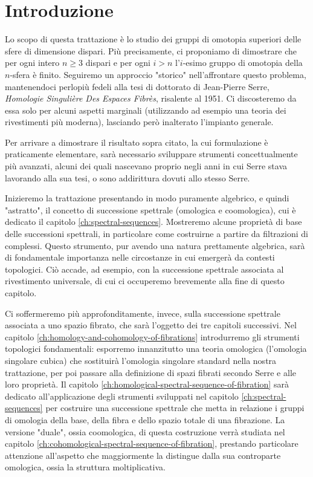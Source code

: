 \chapter*{Introduzione}
Lo scopo di questa trattazione è lo studio dei gruppi di omotopia superiori delle sfere di dimensione dispari. Più precisamente, ci proponiamo di dimostrare che per ogni intero $n\ge 3$ dispari e per ogni $i>n$ l'$i$-esimo gruppo di omotopia della $n$-sfera è finito. Seguiremo un approccio "storico" nell'affrontare questo problema, mantenendoci perlopiù fedeli alla tesi di dottorato di Jean-Pierre Serre, \emph{Homologie Singulière Des Espaces Fibrès}, risalente al 1951. Ci discosteremo da essa solo per alcuni aspetti marginali (utilizzando ad esempio una teoria dei rivestimenti più moderna), lasciando però inalterato l'impianto generale.

Per arrivare a dimostrare il risultato sopra citato, la cui formulazione è praticamente elementare, sarà necessario sviluppare strumenti concettualmente più avanzati, alcuni dei quali nascevano proprio negli anni in cui Serre stava lavorando alla sua tesi, o sono addirittura dovuti allo stesso Serre.

Inizieremo la trattazione presentando in modo puramente algebrico, e quindi "astratto", il concetto di successione spettrale (omologica e coomologica), cui è dedicato il capitolo \ref{ch:spectral-sequences}. Mostreremo alcune proprietà di base delle successioni spettrali, in particolare come costruirne a partire da filtrazioni di complessi. Questo strumento, pur avendo una natura prettamente algebrica, sarà di fondamentale importanza nelle circostanze in cui emergerà da contesti topologici. Ciò accade, ad esempio, con la successione spettrale associata al rivestimento universale, di cui ci occuperemo brevemente alla fine di questo capitolo.

Ci soffermeremo più approfonditamente, invece, sulla successione spettrale associata a uno spazio fibrato, che sarà l'oggetto dei tre capitoli successivi. Nel capitolo \ref{ch:homology-and-cohomology-of-fibrations} introdurremo gli strumenti topologici fondamentali: esporremo innanzitutto una teoria omologica (l'omologia singolare cubica) che sostituirà l'omologia singolare standard nella nostra trattazione, per poi passare alla definizione di spazi fibrati secondo Serre e alle loro proprietà. Il capitolo \ref{ch:homological-spectral-sequence-of-fibration} sarà dedicato all'applicazione degli strumenti sviluppati nel capitolo \ref{ch:spectral-sequences} per costruire una successione spettrale che metta in relazione i gruppi di omologia della base, della fibra e dello spazio totale di una fibrazione. La versione "duale", ossia coomologica, di questa costruzione verrà studiata nel capitolo \ref{ch:cohomological-spectral-sequence-of-fibration}, prestando particolare attenzione all'aspetto che maggiormente la distingue dalla sua controparte omologica, ossia la struttura moltiplicativa.

